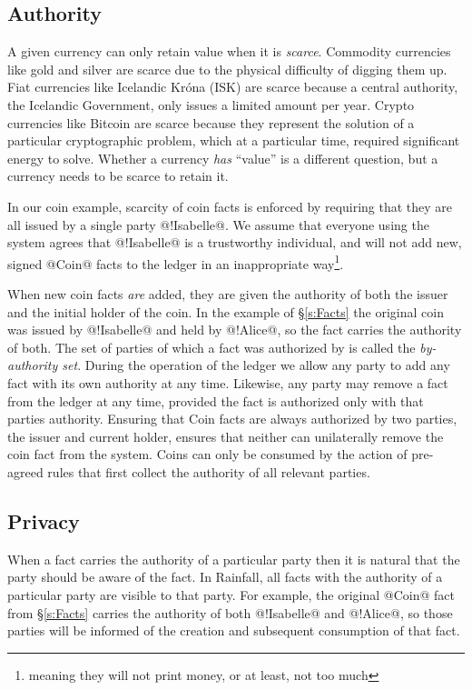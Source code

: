 \subsection{Authority}
\label{s:Authority}
A given currency can only retain value when it is \emph{scarce}. Commodity currencies like gold and silver are scarce due to the physical difficulty of digging them up. Fiat currencies like Icelandic Kr\'ona (ISK) are scarce because a central authority, the Icelandic Government, only issues a limited amount per year. Crypto currencies like Bitcoin are scarce because they represent the solution of a particular cryptographic problem, which at a particular time, required significant energy to solve. Whether a currency \emph{has} ``value'' is a different question, but a currency needs to be scarce to retain it.

In our coin example, scarcity of coin facts is enforced by requiring that they are all issued by a single party @!Isabelle@. We assume that everyone using the system agrees that @!Isabelle@ is a trustworthy individual, and will not add new, signed @Coin@ facts to the ledger in an inappropriate way\footnote{meaning they will not print money, or at least, not too much}.

When new coin facts \emph{are} added, they are given the authority of both the issuer and the initial holder of the coin. In the example of \S\ref{s:Facts} the original coin was issued by @!Isabelle@ and held by @!Alice@, so the fact carries the authority of both. The set of parties of which a fact was authorized by is called the \emph{by-authority set}. During the operation of the ledger we allow any party to add any fact with its own authority at any time. Likewise, any party may remove a fact from the ledger at any time, provided the fact is authorized only with that parties authority. Ensuring that Coin facts are always authorized by two parties, the issuer and current holder, ensures that neither can unilaterally remove the coin fact from the system. Coins can only be consumed by the action of pre-agreed rules that first collect the authority of all relevant parties.


\eject
\subsection{Privacy}
When a fact carries the authority of a particular party then it is natural that the party should be aware of the fact. In Rainfall, all facts with the authority of a particular party are visible to that party. For example, the original @Coin@ fact from \S\ref{s:Facts} carries the authority of both @!Isabelle@ and @!Alice@, so those parties will be informed of the creation and subsequent consumption of that fact.


